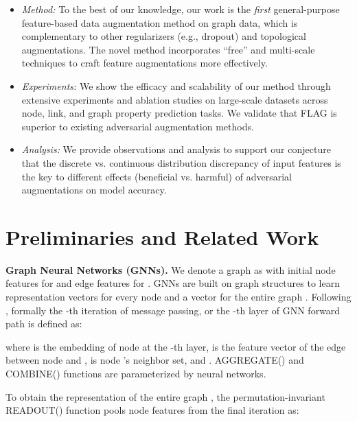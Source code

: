 \documentclass[11pt]{article}
\begin{document}
\begin{itemize}
    \item \textit{Method:} To the best of our knowledge, our work is the \textit{first} general-purpose feature-based data augmentation method on graph data, which is complementary to other regularizers (e.g., dropout) and topological augmentations. The novel method incorporates ``free'' and multi-scale techniques to craft feature augmentations more effectively.
\item \textit{Experiments:} We show the efficacy and scalability of our method through extensive experiments and ablation studies on large-scale datasets across node, link, and graph property prediction tasks. We validate that FLAG is superior to existing adversarial augmentation methods.
\item \textit{Analysis:} We provide observations and analysis to support our conjecture that the discrete vs. continuous distribution discrepancy of input features is the key to different effects (beneficial vs. harmful) of adversarial augmentations on model accuracy.
\end{itemize}

 \section{Preliminaries and Related Work}\label{sec:pre}


{\bf Graph Neural Networks (GNNs).} We denote a graph as  with initial node features  for  and edge features  for . GNNs are built on graph structures to learn representation vectors  for every node  and a vector  for the entire graph . Following \citet{hu2019strategies}, formally the -th iteration of message passing, or the -th layer of GNN forward path is defined as:

where  is the embedding of node  at the -th layer,  is the feature vector of the edge between node  and ,  is node 's neighbor set, and . AGGREGATE() and COMBINE() functions are parameterized by neural networks. 



To obtain the representation of the entire graph , the permutation-invariant READOUT() function pools node features from the final iteration  as:
\noindent

\noindent
\end{document}
